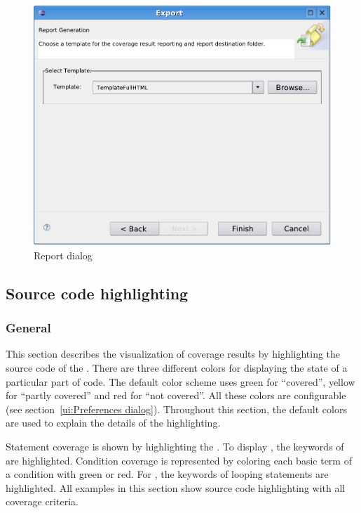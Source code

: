 \begin{figure}[hbt]
 \centering
 \includegraphics[width=1.0\textwidth]{images/Report_Configuration_Dialog/Report_Configuration_Dialog}
 \caption{Report dialog}
 \label{ui_fg:Report dialog}
\end{figure}
\par

\subsection{Source code highlighting} \label{ui:Source code highlighting}
\subsubsection{General}
This section describes the visualization of coverage results by highlighting  the source code of the . There are three different colors for displaying the state of a particular part of code. The default color scheme uses green for ``covered'', yellow for ``partly covered'' and red for ``not covered''. All these colors are configurable (see section~\ref{ui:Preferences dialog}). Throughout this section, the default colors are used to explain the details of the highlighting. 

Statement coverage is shown by highlighting the . To display , the keywords of  are highlighted. Condition coverage is represented by coloring each basic term of a condition with green or red. For , the keywords of looping statements are highlighted. All examples in this section show source code highlighting with all coverage criteria.
